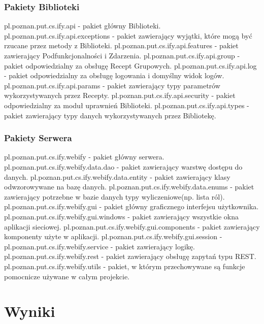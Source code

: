 \documentclass[11pt,a4paper,polish,thesis]{dcsbook}
\begin{document}
\subsection{Pakiety Biblioteki}
pl.poznan.put.cs.ify.api - pakiet główny Biblioteki.
pl.poznan.put.cs.ify.api.exceptions - pakiet zawierający wyjątki, które mogą być rzucane przez metody z Biblioteki.
pl.poznan.put.cs.ify.api.features - pakiet zawierający Podfunkcjonalności i Zdarzenia.
pl.poznan.put.cs.ify.api.group - pakiet odpowiedzialny za obsługę Recept Grupowych.
pl.poznan.put.cs.ify.api.log - pakiet odpowiedzialny za obsługę logowania i domyślny widok logów.
pl.poznan.put.cs.ify.api.params - pakiet zawierający typy parametrów wykorzystywanych przez Recepty.
pl.poznan.put.cs.ify.api.security - pakiet odpowiedzialny za moduł uprawnień Biblioteki.
pl.poznan.put.cs.ify.api.types - pakiet zawierający typy danych wykorzystywanych przez Bibliotekę.
\subsection{Pakiety Serwera}
pl.poznan.put.cs.ify.webify - pakiet główny serwera.
pl.poznan.put.cs.ify.webify.data.dao - pakiet zawierający warstwę dostępu do danych.
pl.poznan.put.cs.ify.webify.data.entity - pakiet zawierający klasy odwzorowywane na bazę danych.
pl.poznan.put.cs.ify.webify.data.enums - pakiet zawierający potrzebne w bazie danych typy wyliczeniowe(np. lista ról). 
pl.poznan.put.cs.ify.webify.gui - pakiet główny graficznego interfejsu użytkownika.
pl.poznan.put.cs.ify.webify.gui.windows - pakiet zawierający wszystkie okna aplikacji sieciowej.
pl.poznan.put.cs.ify.webify.gui.components - pakiet zawierający komponenty użyte w aplikacji.
pl.poznan.put.cs.ify.webify.gui.session - 
pl.poznan.put.cs.ify.webify.service - pakiet zawierający logikę.
pl.poznan.put.cs.ify.webify.rest - pakiet zawierający obsługę zapytań typu REST.
pl.poznan.put.cs.ify.webify.utils - pakiet, w którym przechowywane są funkcje pomocnicze używane w całym projekcie.

\chapter{Wyniki}
\end{document}
